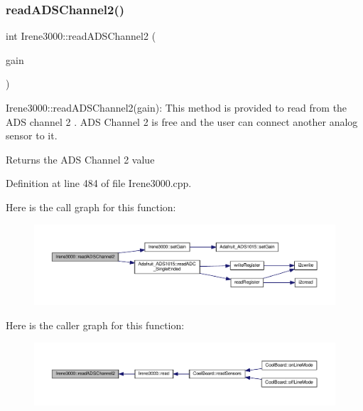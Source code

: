 \subsubsection{\texorpdfstring{read\+A\+D\+S\+Channel2()}{readADSChannel2()}}
{\footnotesize\ttfamily int Irene3000\+::read\+A\+D\+S\+Channel2 (\begin{DoxyParamCaption}\item[{\hyperlink{_cool_adafruit___a_d_s1015_8h_a3d6c0e15829a207b9155890811fa4781}{ads\+Gain\+\_\+t}}]{gain }\end{DoxyParamCaption})}

Irene3000\+::read\+A\+D\+S\+Channel2(gain)\+: This method is provided to read from the A\+DS channel 2 . A\+DS Channel 2 is free and the user can connect another analog sensor to it.

\begin{DoxyReturn}{Returns}
the A\+DS Channel 2 value 
\end{DoxyReturn}


Definition at line 484 of file Irene3000.\+cpp.

Here is the call graph for this function\+:\nopagebreak
\begin{figure}[H]
\begin{center}
\leavevmode
\includegraphics[width=350pt]{class_irene3000_ae73bd2ed14a199a7e83f4d6458476a7c_cgraph}
\end{center}
\end{figure}
Here is the caller graph for this function\+:\nopagebreak
\begin{figure}[H]
\begin{center}
\leavevmode
\includegraphics[width=350pt]{class_irene3000_ae73bd2ed14a199a7e83f4d6458476a7c_icgraph}
\end{center}
\end{figure}
\mbox{\label{class_irene3000_a78a87eb7cf295b95c12b2ebd51c2bb77}} 

